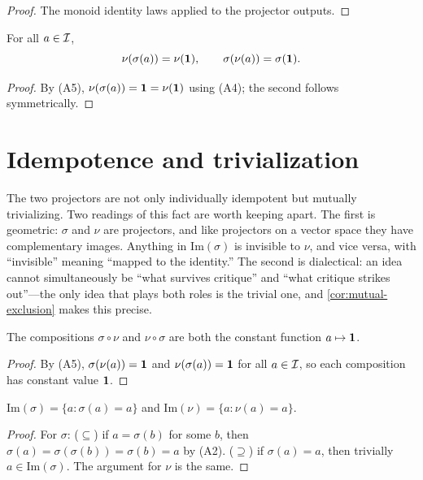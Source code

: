 \begin{proof}
The monoid identity laws applied to the projector outputs.
\end{proof}

\begin{lemma}\label{lem:cross-cong}
For all $a\in\mathcal{I}$,
\[
\nu(\sigma(a))=\nu(\mathbf{1}),\qquad \sigma(\nu(a))=\sigma(\mathbf{1}).
\]
\end{lemma}

\begin{proof}
By (A5), $\nu(\sigma(a))=\mathbf{1}=\nu(\mathbf{1})$ using (A4); the second
follows symmetrically.
\end{proof}

\section{Idempotence and trivialization}\label{sec:idempotence}

The two projectors are not only individually idempotent but mutually
trivializing. Two readings of this fact are worth keeping apart. The
first is geometric: $\sigma$ and $\nu$ are projectors, and like
projectors on a vector space they have complementary images. Anything
in $\mathrm{Im}(\sigma)$ is invisible to $\nu$, and vice versa, with
``invisible'' meaning ``mapped to the identity.'' The second is
dialectical: an idea cannot simultaneously be ``what survives
critique'' and ``what critique strikes out''---the only idea that
plays both roles is the trivial one, and \cref{cor:mutual-exclusion}
makes this precise.

\begin{theorem}\label{thm:trivialization}
The compositions $\sigma\circ\nu$ and $\nu\circ\sigma$ are both the
constant function $a\mapsto\mathbf{1}$.
\end{theorem}

\begin{proof}
By (A5), $\sigma(\nu(a))=\mathbf{1}$ and $\nu(\sigma(a))=\mathbf{1}$ for all
$a\in\mathcal{I}$, so each composition has constant value $\mathbf{1}$.
\end{proof}

\begin{corollary}\label{cor:image-fixed}
$\mathrm{Im}(\sigma)=\{a:\sigma(a)=a\}$ and
$\mathrm{Im}(\nu)=\{a:\nu(a)=a\}$.
\end{corollary}

\begin{proof}
For $\sigma$: ($\subseteq$) if $a=\sigma(b)$ for some $b$, then
$\sigma(a)=\sigma(\sigma(b))=\sigma(b)=a$ by (A2). ($\supseteq$) if
$\sigma(a)=a$, then trivially $a\in\mathrm{Im}(\sigma)$. The argument
for $\nu$ is the same.
\end{proof}


